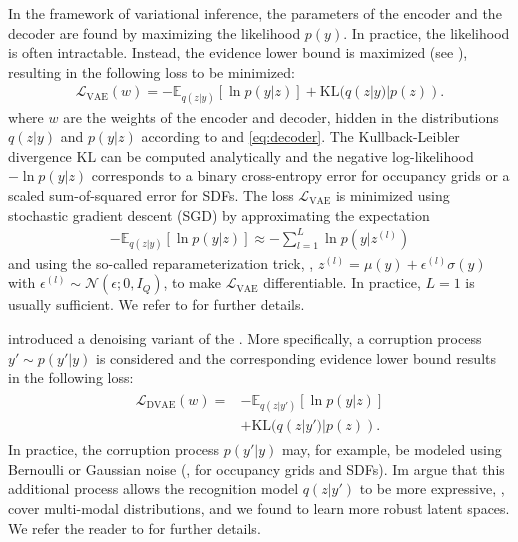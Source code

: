 In the framework of variational inference, the parameters of the encoder and the decoder are found by maximizing the likelihood $p(y)$. In practice, the likelihood is often intractable. Instead, the evidence lower bound is maximized (see \citep{Kingma2014ICLR,Blei2016ARXIV}), resulting in the following loss to be minimized:
%
\begin{align}
\mathcal{L}_{\text{VAE}}(w) = - \mathbb{E}_{q(z |y)}[\ln p(y|z)] + \text{KL}(q(z | y)| p(z)).
\end{align}
%
where $w$ are the weights of the encoder and decoder, hidden in the distributions $q(z|y)$ and $p(y|z)$ according to  and \eqref{eq:decoder}. The Kullback-Leibler divergence $\text{KL}$ can be computed analytically and the negative log-likelihood $-\ln p(y|z)$ corresponds to a binary cross-entropy error for occupancy grids or a scaled sum-of-squared error for SDFs. The loss $\mathcal{L}_{\text{VAE}}$ is minimized using stochastic gradient descent (SGD) by approximating the expectation
%
\begin{align}
- \mathbb{E}_{q(z |y)}[\ln p(y|z)] \approx - \sum_{l = 1}^L \ln p(y | z^{(l)})
\end{align}
%
and using the so-called reparameterization trick, \ie, $z^{(l)} = \mu(y) + \epsilon^{(l)} \sigma(y)$ with $\epsilon^{(l)} \sim \mathcal{N}(\epsilon; 0, I_Q)$, to make $\mathcal{L}_{\text{VAE}}$ differentiable. In practice, $L = 1$ is usually sufficient. We refer to \citep{Kingma2014ICLR} for further details.

%
\cite{Im2017AAAI} introduced a denoising variant of the \VAE. More specifically, a corruption process $y' \sim p(y' | y)$ is considered and the corresponding evidence lower bound results in the following loss:
%
\begin{align}
    \begin{split}
        \mathcal{L}_{\text{DVAE}}(w) =& - \mathbb{E}_{q(z | y')}[\ln p(y|z)]\\
        &+ \text{KL}(q(z | y')| p(z)).
    \end{split}
\end{align}
%
In practice, the corruption process $p(y' | y)$ may, for example, be modeled using Bernoulli or Gaussian noise (\eg, for occupancy grids and SDFs).
Im \etal argue that this additional process allows the recognition model $q(z | y')$ to be more expressive, \eg, cover multi-modal distributions, and we found \DVAEs to learn more robust latent spaces. We refer the reader to \citep{Im2017AAAI} for further details.

